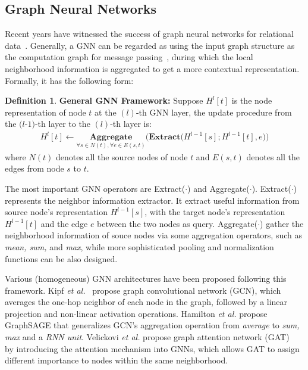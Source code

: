 \documentclass[sigconf]{acmart}
\theoremstyle{definition}
\newtheorem{defn}[theorem]{Definition}
\begin{document}
\subsection{Graph Neural Networks}
Recent years have witnessed the success of graph neural networks for relational data~\cite{gcn,gat,graphsage}. 
Generally, a GNN can be regarded as using the input graph structure as the computation graph for message passing~\cite{DBLP:conf/icml/GilmerSRVD17}, during which the local neighborhood information is aggregated to get a more contextual representation. Formally, it has the following form:
\begin{defn}{\textbf{General GNN Framework:}}
Suppose $H^{l}[t]$ is the node representation of node $t$ at the $(l)$-th GNN layer, the update procedure from the $(l$-$1)$-th layer to the $(l)$-th layer is:
\begin{align}
H^{l}[t] \gets \underset{\forall s \in N(t), \forall e \in E(s,t)}{\textbf{Aggregate}}\bigg(  \textbf{Extract}\Big(H^{l-1}[s]; H^{l-1}[t], e\Big)\bigg)
\end{align}
where $N(t)$ denotes all the source nodes of node $t$ and $E(s,t)$  denotes all the edges from node $s$ to $t$. 
\end{defn}

The most important GNN operators are Extract($\cdot$) and Aggregate($\cdot$). 
Extract($\cdot$) represents the neighbor information extractor. 
It extract useful information from source node's representation $H^{l-1}[s]$, with the target node's representation $H^{l-1}[t]$ and the edge $e$ between the two nodes as query. 
Aggregate($\cdot$) gather the neighborhood information of souce nodes via some aggregation operators, such as \textit{mean, sum,} and \textit{max}, while more sophisticated pooling and normalization functions can be also designed.

Various (homogeneous) GNN architectures have been proposed following this framework.  
Kipf \textit{et al.}~\cite{gcn} propose graph convolutional network (GCN), which averages the one-hop neighbor of each node in the graph, followed by a linear projection and non-linear activation operations. 
Hamilton  \textit{et al.} propose GraphSAGE that generalizes GCN's aggregation operation from \textit{average} to \textit{sum, max} and a \textit{RNN unit}. 
Velickovi  \textit{et al.} propose graph attention network (GAT)~\cite{gat} by introducing the attention mechanism into GNNs, which allows GAT to assign different importance to nodes within the same neighborhood. 
\end{document}
